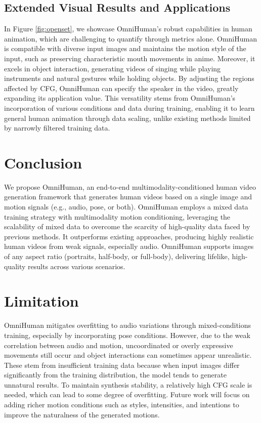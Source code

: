 \subsection{Extended Visual Results and Applications}
In Figure \ref{fig:openset}, we showcase OmniHuman's robust capabilities in human animation, which are challenging to quantify through metrics alone. OmniHuman is compatible with diverse input images and maintains the motion style of the input, such as preserving characteristic mouth movements in anime. Moreover, it excels in object interaction, generating videos of singing while playing instruments and natural gestures while holding objects. By adjusting the regions affected by CFG, OmniHuman can specify the speaker in the video, greatly expanding its application value. This versatility stems from OmniHuman's incorporation of various conditions and data during training, enabling it to learn general human animation through data scaling, unlike existing methods limited by narrowly filtered training data.


\section{Conclusion}
We propose OmniHuman, an end-to-end multimodality-conditioned human video generation framework that generates human videos based on a single image and motion signals (e.g., audio, pose, or both). OmniHuman employs a mixed data training strategy with multimodality motion conditioning, leveraging the scalability of mixed data to overcome the scarcity of high-quality data faced by previous methods. It outperforms existing approaches, producing highly realistic human videos from weak signals, especially audio. OmniHuman supports images of any aspect ratio (portraits, half-body, or full-body), delivering lifelike, high-quality results across various scenarios.


\section*{Limitation}
OmniHuman mitigates overfitting to audio variations through mixed-conditions training, especially by incorporating pose conditions. However, due to the weak correlation between audio and motion, uncoordinated or overly expressive movements still occur and object interactions can sometimes appear unrealistic. These stem from insufficient training data because when input images differ significantly from the training distribution, the model tends to generate unnatural results. To maintain synthesis stability, a relatively high CFG scale is needed, which can lead to some degree of overfitting. Future work will focus on adding richer motion conditions such as styles, intensities, and intentions to improve the naturalness of the generated motions.